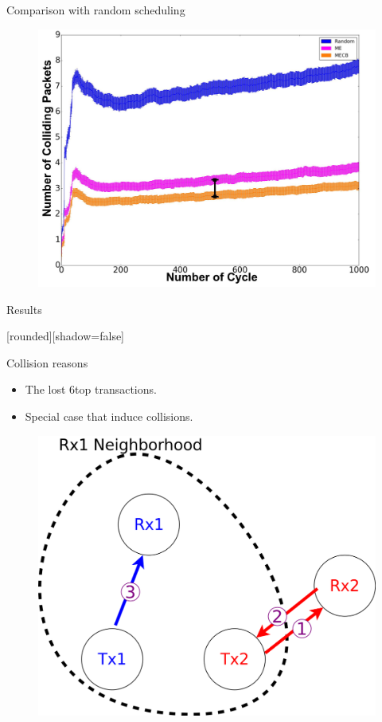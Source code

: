 \begin{withoutheadline}
\addtocounter{framenumber}{-1}
\begin{frame}{Comparison with random scheduling}

\begin{figure}[p]


\includegraphics[width=.9\linewidth]{figures/graph1-2.png}
\end{figure}



\end{frame}
\end{withoutheadline}


\begin{withoutheadline}
\begin{frame}{ Results}


[rounded][shadow=false]


\begin{block}{Collision reasons}

    \begin{itemize}
    \item The lost 6top transactions. 
\item Special case that induce collisions.
    
     
    
    \end{itemize}
    \end{block}

\centering
\begin{figure}[p]

\item\includegraphics[width=0.4\linewidth]{figures/pro.png}
\end{figure}

\end{frame}
\end{withoutheadline}


